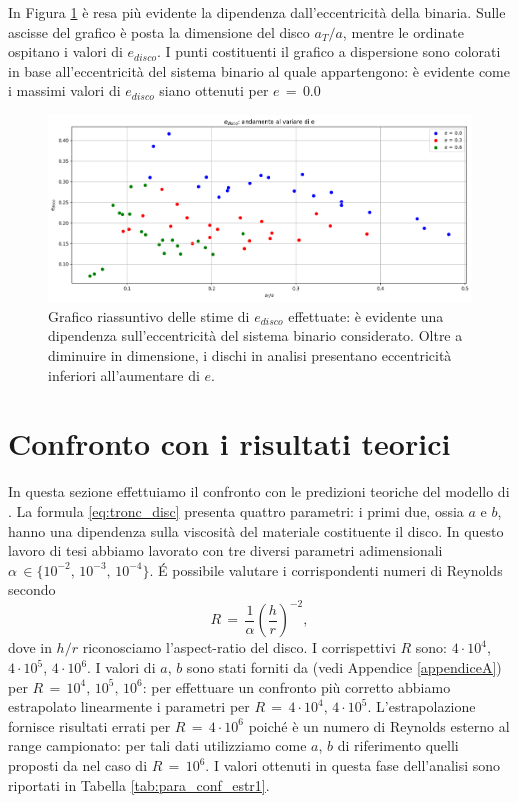 In Figura \ref{fig:riass_edisco} è resa più evidente la dipendenza dall'eccentricità della binaria. Sulle ascisse del grafico è posta la dimensione del disco $a_T/a$, mentre le ordinate ospitano i valori di $e_{disco}$.
I punti costituenti il grafico a dispersione sono colorati in base all'eccentricità del sistema binario al quale appartengono: è evidente come i massimi valori di $e_{disco}$ siano ottenuti per $e\,=\,0.0$

\begin{figure}[h]
  \centering
  \includegraphics[width=\textwidth]{Immagini/Risultati/riassuntivo_edisco.png}
  \caption{Grafico riassuntivo delle stime di $e_{disco}$ effettuate: è evidente una dipendenza sull'eccentricità del sistema binario considerato. Oltre a diminuire in dimensione, i dischi in analisi presentano eccentricità inferiori all'aumentare di $e$.}
  \label{fig:riass_edisco}
\end{figure}


\section{Confronto con i risultati teorici} \label{sec:conf_teo}

In questa sezione effettuiamo il confronto con le predizioni teoriche del modello di \textcite{ManaraTronc2019}. 
La formula \eqref{eq:tronc_disc} presenta quattro parametri: i primi due, ossia $a$ e $b$, hanno una dipendenza sulla viscosità del materiale costituente il disco.
In questo lavoro di tesi abbiamo lavorato con tre diversi parametri adimensionali $\alpha\,\in \{10^{-2},\,10^{-3},\,10^{-4}\}$.
\'E possibile valutare i corrispondenti numeri di Reynolds secondo
\begin{equation}
R\,=\,\frac{1}{\alpha} \left(\frac{h}{r}\right)^{-2},
\label{eq:rey_disc}
\end{equation}
dove in $h/r$ riconosciamo l'aspect-ratio del disco. I corrispettivi $R$ sono: $4 \cdot 10^4$, $4 \cdot 10^5$, $4 \cdot 10^6$.
I valori di $a$, $b$ sono stati forniti da \textcite{ManaraTronc2019} (vedi Appendice \ref{appendiceA}) per $R\,=\,10^4,\,10^5,\,10^6$: per effettuare un confronto più corretto abbiamo estrapolato linearmente i parametri per $R\,=\,4\cdot 10^4,\,4\cdot10^5$.
L'estrapolazione fornisce risultati errati per $R\,=\,4 \cdot 10^6$ poiché è un numero di Reynolds esterno al range campionato: per tali dati utilizziamo come $a$, $b$ di riferimento quelli proposti da \textcite{ManaraTronc2019} nel caso di $R\,=\,10^6$. I valori ottenuti in questa fase dell'analisi sono riportati in Tabella \ref{tab:para_conf_estr1}.

